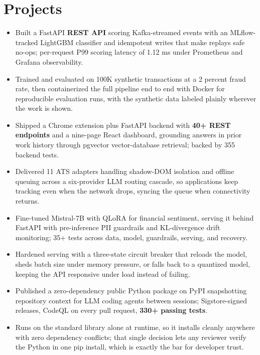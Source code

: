 \documentclass[letterpaper,10pt]{article}
\begin{document}
\section{Projects}
\begin{itemize}
\item Built a FastAPI \textbf{REST API} scoring Kafka-streamed events with an MLflow-tracked LightGBM classifier and idempotent writes that make replays safe no-ops; per-request P99 scoring latency of 1.12 ms under Prometheus and Grafana observability.
\item Trained and evaluated on 100K synthetic transactions at a 2 percent fraud rate, then containerized the full pipeline end to end with Docker for reproducible evaluation runs, with the synthetic data labeled plainly wherever the work is shown.
\end{itemize}
\begin{itemize}
\item Shipped a Chrome extension plus FastAPI backend with \textbf{40+ REST endpoints} and a nine-page React dashboard, grounding answers in prior work history through pgvector vector-database retrieval; backed by 355 backend tests.
\item Delivered 11 ATS adapters handling shadow-DOM isolation and offline queuing across a six-provider LLM routing cascade, so applications keep tracking even when the network drops, syncing the queue when connectivity returns.
\end{itemize}
\begin{itemize}
\item Fine-tuned Mistral-7B with QLoRA for financial sentiment, serving it behind FastAPI with pre-inference PII guardrails and KL-divergence drift monitoring; 35+ tests across data, model, guardrails, serving, and recovery.
\item Hardened serving with a three-state circuit breaker that reloads the model, sheds batch size under memory pressure, or falls back to a quantized model, keeping the API responsive under load instead of failing.
\end{itemize}
\begin{itemize}
\item Published a zero-dependency public Python package on PyPI snapshotting repository context for LLM coding agents between sessions; Sigstore-signed releases, CodeQL on every pull request, \textbf{330+ passing tests}.
\item Runs on the standard library alone at runtime, so it installs cleanly anywhere with zero dependency conflicts; that single decision lets any reviewer verify the Python in one pip install, which is exactly the bar for developer trust.
\end{itemize}
\end{document}

